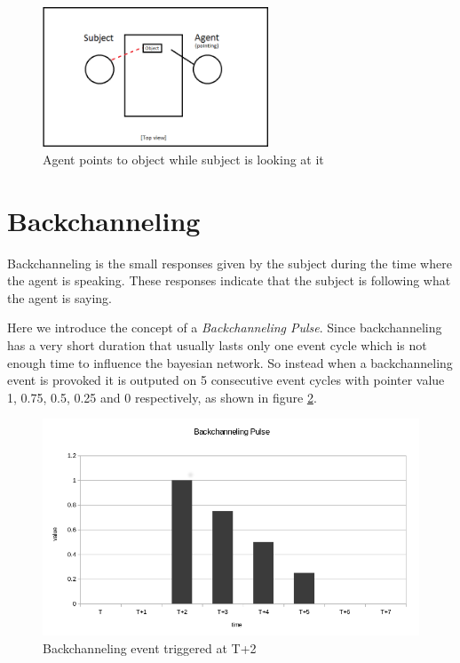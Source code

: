 \documentclass[12pt, a4paper, fleqn]{memoir}%
\begin{document}
\begin{figure}[h!]
    \centering
    \includegraphics[width=0.6\textwidth]{DG}
    \caption{Agent points to object while subject is looking at it}
    \label{fig:DG_img}
\end{figure}

\section{Backchanneling}
\label{sec:Backchanneling}
Backchanneling is the small responses given by the subject during the time where the agent is speaking. These responses indicate that the subject is following what the agent is saying.

Here we introduce the concept of a \textit{Backchanneling Pulse}. Since backchanneling has a very short duration that usually lasts only one event cycle which is not enough time to influence the bayesian network. So instead when a backchanneling event is provoked it is outputed on 5 consecutive event cycles with pointer value 1, 0.75, 0.5, 0.25 and 0 respectively, as shown in figure \ref{fig:bcp_img}.

\begin{figure}[h!]
    \centering
    \includegraphics[width=1\textwidth]{bcp}
    \caption{Backchanneling event triggered at T+2}
    \label{fig:bcp_img}
\end{figure}
\end{document}
